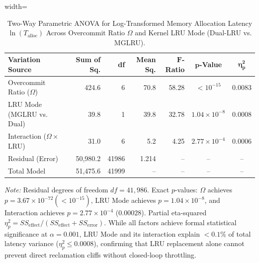 \begin{table}[t]
\centering
\caption{Two-Way Parametric ANOVA for Log-Transformed Memory Allocation Latency $\ln(T_{\text{alloc}})$ Across Overcommit Ratio $\Omega$ and Kernel LRU Mode (Dual-LRU vs. MGLRU).}
\label{tab:anova}
\footnotesize
\begin{adjustbox}{width=\linewidth}
\begin{tabular}{lrrrrcc}
\toprule
\textbf{Variation Source} & \textbf{Sum of Sq.} & \textbf{df} & \textbf{Mean Sq.} & $\mathbf{F}$\textbf{-Ratio} & $\mathbf{p}$\textbf{-Value} & $\mathbf{\eta_p^2}$ \\
\midrule
Overcommit Ratio ($\Omega$) & 424.6 & 6 & 70.8 & 58.28 & $< 10^{-15}$ & 0.0083 \\
LRU Mode (MGLRU vs. Dual) & 39.8 & 1 & 39.8 & 32.78 & $1.04 \times 10^{-8}$ & 0.0008 \\
Interaction ($\Omega \times$ LRU) & 31.0 & 6 & 5.2 & 4.25 & $2.77 \times 10^{-4}$ & 0.0006 \\
Residual (Error) & 50,980.2 & 41986 & 1.214 & -- & -- & -- \\
\midrule
Total Model & 51,475.6 & 41999 & -- & -- & -- & -- \\
\bottomrule
\end{tabular}
\end{adjustbox}
\begin{tablenotes}
\item \footnotesize{\textit{Note:} Residual degrees of freedom $df = 41,986$. Exact $p$-values: $\Omega$ achieves $p = 3.67 \times 10^{-72} (< 10^{-15})$, LRU Mode achieves $p = 1.04 \times 10^{-8}$, and Interaction achieves $p = 2.77 \times 10^{-4}$ ($0.00028$). Partial eta-squared $\eta_p^2 = SS_{\text{effect}} / (SS_{\text{effect}} + SS_{\text{error}})$. While all factors achieve formal statistical significance at $\alpha = 0.001$, LRU Mode and its interaction explain $< 0.1\%$ of total latency variance ($\eta_p^2 \le 0.0008$), confirming that LRU replacement alone cannot prevent direct reclamation cliffs without closed-loop throttling.}
\end{tablenotes}
\end{table}
